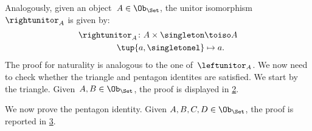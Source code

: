 \begin{example}
  \begin{figure}[h!]
    \begin{center}
    \end{center}
    \caption{\label{fig:monoidal_set_unit_nat}}
  \end{figure}

  Analogously, given an object~$A\in \Ob_{\Set}$, the unitor isomorphism~$\rightunitor_A$ is given by:
  \begin{equation*}
    \begin{aligned}
      \rightunitor_A\colon A\times \singleton &\toiso A\\
      \tup{a,\singletonel}&\mapsto a.
    \end{aligned}
  \end{equation*}
  The proof for naturality is analogous to the one of~$\leftunitor_A$. We now need to check whether the triangle and pentagon identites are satisfied. We start by the triangle. Given~$A,B\in \Ob_{\Set}$, the proof is displayed in \cref{fig:set_mon_triangle}.

  \begin{figure}[h]
    \begin{center}
    \end{center}
    \caption{\label{fig:set_mon_triangle}}
  \end{figure}

  We now prove the pentagon identity. Given $A,B,C,D\in \Ob_\Set$, the proof is reported in \cref{fig:set_mon_pent}.


  \begin{figure}[h]
    \begin{center}
    \end{center}
    \caption{\label{fig:set_mon_pent}}
  \end{figure}
\end{example}



